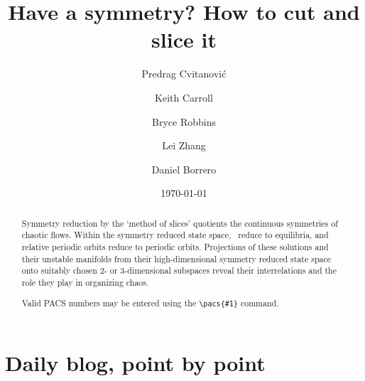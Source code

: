 \documentclass[twocolumn,
secnumarabic,
nofootinbib, tightenlines,
nobibnotes, showkeys, aps,
cha]{revtex4-1}
\begin{document}
\title[How to cut and slice a symmetry]
{Have a symmetry? How to cut and slice it}


\author{Predrag Cvitanovi{\'c}}
\author{Keith Carroll}
\author{Bryce Robbins}
\author{Lei Zhang}
\author{Daniel Borrero}

\date{\today}

\begin{abstract}
Symmetry reduction by the `method of slices'
quotients the continuous symmetries of chaotic flows. Within the
symmetry reduced state space, \reqva\ reduce to
equilibria, and relative periodic orbits reduce to periodic orbits.
Projections of these solutions and their unstable manifolds from their
high-dimensional symmetry reduced state space onto suitably chosen 2-
or 3-dimensional subspaces reveal their interrelations and the role they
play in organizing chaos.

%
Valid PACS numbers may be entered using the \verb+\pacs{#1}+ command.
\end{abstract}

\maketitle








% 


\ifdraft
    \onecolumngrid

    \newpage


    \newpage
    \section{Daily blog, point by point}
    \label{chap:atlas}

\fi
\end{document}
